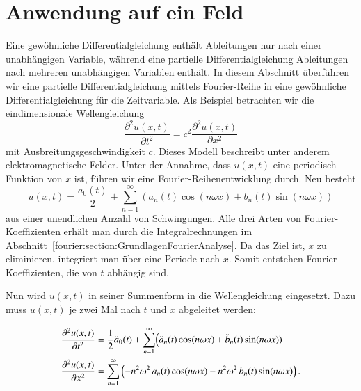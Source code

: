 %
%
%
%



\section{Anwendung auf ein Feld\label{fourier:section:AnwendungAufFeld}}

Eine gewöhnliche Differentialgleichung enthält Ableitungen nur nach einer unabhängigen Variable, während eine partielle Differentialgleichung Ableitungen nach mehreren unabhängigen Variablen enthält.  
In diesem Abschnitt überführen wir eine partielle Differentialgleichung mittels Fourier-Reihe in eine gewöhnliche Differentialgleichung für die Zeitvariable.
Als Beispiel betrachten wir die eindimensionale Wellengleichung  
\begin{equation}\label{eq:wellengleichung}
	\frac{\partial^2 u(x,t)}{\partial t^2} = c^2 \frac{\partial^2 u(x,t)}{\partial x^2}
\end{equation}  
mit Ausbreitungsgeschwindigkeit $c$. Dieses Modell beschreibt unter anderem elektromagnetische Felder.  
%
Unter der Annahme, dass $u(x, t)$ eine periodisch Funktion von $x$ ist, führen wir eine Fourier-Reihenentwicklung durch. 
Neu besteht 
\begin{equation}
	u(x,t) = \frac{a_0(t)}{2} + \sum_{n=1}^{\infty} \left( a_n(t) \cos(n \omega x) + b_n(t) \sin(n \omega x) \right)
\end{equation}
aus einer unendlichen Anzahl von Schwingungen.
Alle drei Arten von Fourier-Koeffizienten erhält man durch die Integralrechnungen im Abschnitt~\ref{fourier:section:GrundlagenFourierAnalyse}. 
Da das Ziel ist, $x$ zu eliminieren, integriert man über eine Periode nach $x$.
Somit entstehen Fourier-Koeffizienten, die von $t$ abhängig sind. 

Nun wird $u(x,t)$ in seiner Summenform in die Wellengleichung eingesetzt. 
Dazu muss $u(x,t)$ je zwei Mal nach $t$ und $x$ abgeleitet werden:

\begin{equation}
	\begin{aligned}
		\frac{\partial^2 u(x,t)}{\partial t^2}
		&= \frac{1}{2}\ddot{a}_0(t) + \sum_{n=1}^{\infty}\Bigl(\ddot{a}_n(t)\cos(n\omega x)+ \ddot{b}_n(t)\sin(n\omega x))
		\\
		\frac{\partial^2 u(x,t)}{\partial x^2}
		&= \sum_{n=1}^{\infty}\left(-n^2\omega^2\,a_n(t)\cos(n\omega x)-n^2\omega^2\,b_n(t)\sin(n\omega x)\right).
	\end{aligned}
\end{equation}

